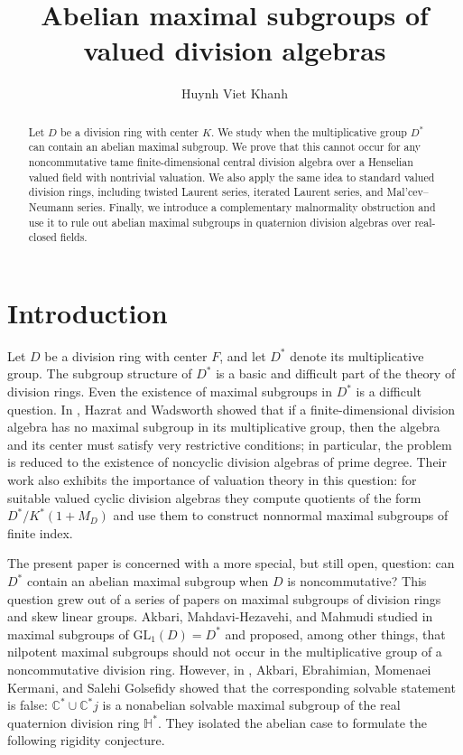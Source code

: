\documentclass[11pt]{amsart}
\title[Abelian maximal subgroups of tame valued division algebras]
{Abelian maximal subgroups of valued division algebras}
\author{Huynh Viet Khanh}
\theoremstyle{definition}
\begin{document}
\begin{abstract}
Let $D$ be a division ring with center $K$. We study when the multiplicative
group $D^*$ can contain an abelian maximal subgroup. We prove that this
cannot occur for any noncommutative tame finite-dimensional central division
algebra over a Henselian valued field with nontrivial valuation. We also apply the same idea to standard valued division rings,
including twisted Laurent series, iterated Laurent series, and
Mal'cev--Neumann series. Finally, we introduce a complementary malnormality
obstruction and use it to rule out abelian maximal subgroups in quaternion
division algebras over real-closed fields.
\end{abstract}

\maketitle

\section{Introduction}

Let $D$ be a division ring with center $F$, and let $D^*$ denote its
multiplicative group.  The subgroup structure of $D^*$ is a basic and
difficult part of the theory of division rings.  Even the existence of maximal subgroups in $D^*$ is a difficult question.  In \cite{HaW1}, Hazrat and Wadsworth showed that if a
finite-dimensional division algebra has no maximal subgroup in its
multiplicative group, then the algebra and its center must satisfy very
restrictive conditions; in particular, the problem is reduced to the existence of
noncyclic division algebras of prime degree.  Their work also exhibits the
importance of valuation theory in this question: for suitable valued cyclic
division algebras they compute quotients of the form
$D^*/K^*(1+M_D)$ and use them to construct nonnormal maximal subgroups of
finite index.

The present paper is concerned with a more special, but still open, question:
can $D^*$ contain an abelian maximal subgroup when $D$ is noncommutative?
This question grew out of a series of papers on maximal subgroups of division
rings and skew linear groups.  Akbari, Mahdavi-Hezavehi, and Mahmudi studied in \cite{AMM} maximal subgroups of $\mathrm{GL}_1(D)=D^*$ and proposed, among other things, that nilpotent maximal subgroups should not occur in the multiplicative group of a
noncommutative division ring.  However, in  \cite{AEKG}, Akbari, Ebrahimian, Momenaei Kermani, and Salehi Golsefidy showed that the corresponding solvable statement is false: $\mathbb C^*\cup \mathbb C^*j$ is a nonabelian solvable maximal subgroup of the real quaternion division ring $\mathbb H^*$. They isolated the abelian case to formulate the following rigidity conjecture.
\end{document}
